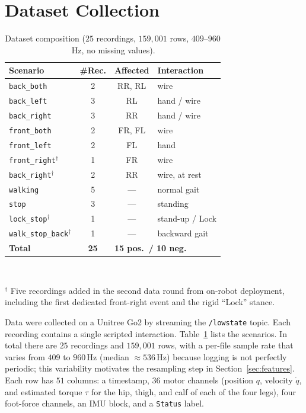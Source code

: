 \documentclass[conference]{IEEEtran}
\begin{document}
\section{Dataset Collection}
\label{sec:dataset}
\begin{table}[t]
\centering
\caption{Dataset composition ($25$ recordings, $159{,}001$ rows,
$409$--$960$\,Hz, no missing values).}
\label{tab:dataset}
\footnotesize
\begin{tabular}{@{}lccl@{}}
\toprule
Scenario & \#Rec. & Affected & Interaction \\
\midrule
\texttt{back\_both}        & 2 & RR, RL & wire \\
\texttt{back\_left}        & 3 & RL     & hand / wire \\
\texttt{back\_right}       & 3 & RR     & hand / wire \\
\texttt{front\_both}       & 2 & FR, FL & wire \\
\texttt{front\_left}       & 2 & FL     & hand \\
\texttt{front\_right}$^{\dagger}$ & 1 & FR & wire \\
\texttt{back\_right}$^{\dagger}$ & 2 & RR & wire, at rest \\
\midrule
\texttt{walking}           & 5 & ---    & normal gait \\
\texttt{stop}              & 3 & ---    & standing \\
\texttt{lock\_stop}$^{\dagger}$ & 1 & --- & stand-up / Lock \\
\texttt{walk\_stop\_back}$^{\dagger}$ & 1 & --- & backward gait \\
\midrule
\textbf{Total} & \textbf{25} & \multicolumn{2}{l}{\textbf{15 pos.\ / 10 neg.}}\\
\bottomrule
\end{tabular}
\\[2pt]
\raggedright\footnotesize $^{\dagger}$ Five recordings added in the second data
round from on-robot deployment, including the first dedicated front-right event and
the rigid ``Lock'' stance.
\end{table}

Data were collected on a Unitree Go2 by streaming the \texttt{/lowstate} topic. Each
recording contains a single scripted interaction. Table~\ref{tab:dataset} lists the
scenarios. In total there are $25$ recordings and $159{,}001$ rows, with a
per-file sample rate that varies from $409$ to $960$\,Hz (median $\approx\!536$\,Hz)
because logging is not perfectly periodic; this variability motivates the resampling
step in Section~\ref{sec:features}. Each row has $51$ columns: a timestamp, $36$
motor channels (position $q$, velocity $\dot q$, and estimated torque $\tau$ for the
hip, thigh, and calf of each of the four legs), four foot-force channels, an IMU
block, and a \texttt{Status} label.
\end{document}
